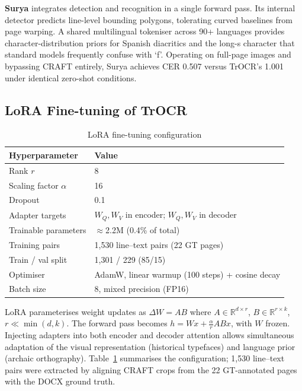 \documentclass[11pt,a4paper]{article}
\begin{document}
\textbf{Surya} \cite{surya2024} integrates detection and recognition in a single forward
pass. Its internal detector predicts line-level bounding polygons, tolerating curved
baselines from page warping. A shared multilingual tokeniser across 90+ languages provides
character-distribution priors for Spanish diacritics and the long-s character that standard
models frequently confuse with `f'. Operating on full-page images and bypassing CRAFT
entirely, Surya achieves CER 0.507 versus TrOCR's 1.001 under identical zero-shot conditions.

\subsection{LoRA Fine-tuning of TrOCR}

\begin{table}[h]
\centering
\caption{LoRA fine-tuning configuration}
\label{tab:lora}
\begin{tabular}{ll}
\toprule
\textbf{Hyperparameter} & \textbf{Value} \\
\midrule
Rank $r$ & 8 \\
Scaling factor $\alpha$ & 16 \\
Dropout & 0.1 \\
Adapter targets & $W_Q, W_V$ in encoder; $W_Q, W_V$ in decoder \\
Trainable parameters & $\approx$2.2M (0.4\% of total) \\
\midrule
Training pairs & 1,530 line--text pairs (22 GT pages) \\
Train / val split & 1,301 / 229 (85/15) \\
Optimiser & AdamW, linear warmup (100 steps) + cosine decay \\
Batch size & 8, mixed precision (FP16) \\
\bottomrule
\end{tabular}
\end{table}

LoRA \cite{lora2022} parameterises weight updates as $\Delta W = AB$ where
$A \in \mathbb{R}^{d \times r}$, $B \in \mathbb{R}^{r \times k}$, $r \ll \min(d,k)$.
The forward pass becomes $h = Wx + \frac{\alpha}{r}ABx$, with $W$ frozen. Injecting
adapters into both encoder and decoder attention allows simultaneous adaptation of the
visual representation (historical typefaces) and language prior (archaic orthography).
Table~\ref{tab:lora} summarises the configuration; 1,530 line--text pairs were extracted
by aligning CRAFT crops from the 22 GT-annotated pages with the DOCX ground truth.
\end{document}
